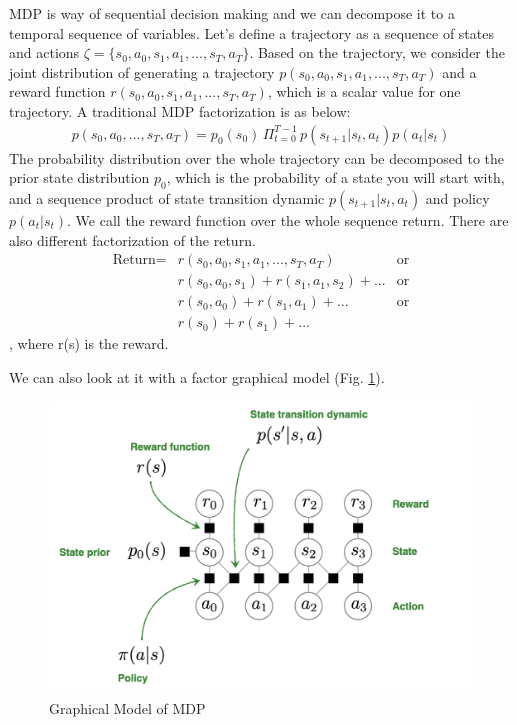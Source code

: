 \documentclass[11pt]{article}
\begin{document}
 MDP is way of sequential decision making and we can decompose it to a temporal sequence of variables. Let's define a trajectory as a sequence of states and actions $\zeta = \{s_0, a_0, s_1, a_1, ..., s_T, a_T\}$. Based on the trajectory, we consider the joint distribution of generating a trajectory $p(s_0, a_0, s_1, a_1, ..., s_T, a_T)$ and a reward function $r(s_0, a_0, s_1, a_1, ..., s_T, a_T)$, which is a scalar value for one trajectory. A traditional MDP factorization is as below:
 \begin{align*}
    p(s_0, a_0, ..., s_T, a_T) = p_0(s_0)\,\Pi_{t=0}^{T-1}\,p(s_{t+1}|s_t, a_t)p(a_t|s_t)
\end{align*}
The probability distribution over the whole trajectory can be decomposed to the prior state distribution $p_0$, which is the probability of a state you will start with, and a sequence product of state transition dynamic $p(s_{t+1}|s_t, a_t)$ and policy $p(a_t|s_t)$.
We call the reward function over the whole sequence return. There are also different factorization of the return.
\begin{align*}
    \textrm{Return} =  & r(s_0, a_0, s_1, a_1, ..., s_T, a_T) & \textrm{or} \\
      & r(s_0, a_0, s_1) + r(s_1, a_1, s_2) + ...  & \textrm{or}\\
      & r(s_0, a_0) + r(s_1, a_1) + ... & \textrm{or}\\
      & r(s_0) + r(s_1) + ...
\end{align*}
, where r(s) is the reward.

We can also look at it with a factor graphical model (Fig. \ref{fig:MDP_model}).
\begin{figure}[H]
    \centering
    \includegraphics[width=.6\linewidth]{images/graphical_model.png}
    \caption{Graphical Model of MDP}
    \label{fig:MDP_model}
\end{figure}
\end{document}
